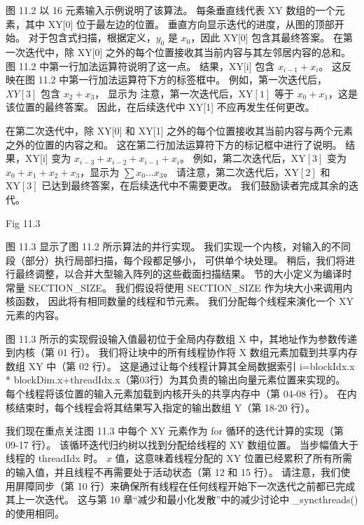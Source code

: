 图 11.2 以 16 元素输入示例说明了该算法。 每条垂直线代表 XY 数组的一个元素，其中 XY[0] 位于最左边的位置。 
垂直方向显示迭代的进度，从图的顶部开始。 对于包含式扫描，根据定义，$y_{0}$ 是 $x_{0}$，因此 XY[0] 包含其最终答案。 
在第一次迭代中，除 XY[0] 之外的每个位置接收其当前内容与其左邻居内容的总和。 图 11.2 中第一行加法运算符说明了这一点。 
结果，XY[i] 包含 $x_{i-1}+x_{i}$。 这反映在图 11.2 中第一行加法运算符下方的标签框中。 
例如，第一次迭代后，$X Y[3]$ 包含 $x_{2}+x_{3}$，
显示为 注意，第一次迭代后，$\mathrm{XY}[1]$ 等于 $ x_{0}+x_{1}$，这是该位置的最终答案。 
因此，在后续迭代中 XY[1] 不应再发生任何更改。

在第二次迭代中，除 XY[0] 和 XY[1] 之外的每个位置接收其当前内容与两个元素之外的位置的内容之和。 
这在第二行加法运算符下方的标记框中进行了说明。 结果，XY[i] 变为 $x_{i-3}+x_{i-2}+x_{i-1}+x_{i}$。 
例如，第二次迭代后，$\mathrm{XY}[3]$ 变为 $x_{0}+x_{1}+x_{2}+x_{3}$，显示为 $\sum x_{0} \ldots x_{3}$。 
请注意，第二次迭代后，$\mathrm{XY}[2]$ 和 $\mathrm{XY}[3]$ 已达到最终答案，在后续迭代中不需要更改。 
我们鼓励读者完成其余的迭代。

{\color{red} Fig 11.3}

图 11.3 显示了图 11.2 所示算法的并行实现。 我们实现一个内核，对输入的不同段（部分）执行局部扫描，每个段都足够小，
可供单个块处理。 稍后，我们将进行最终调整，以合并大型输入阵列的这些截面扫描结果。 
节的大小定义为编译时常量 SECTION\_SIZE。 我们假设将使用 SECTION\_SIZE 作为块大小来调用内核函数，
因此将有相同数量的线程和节元素。 我们分配每个线程来演化一个 $\mathrm{XY}$ 元素的内容。

图 11.3 所示的实现假设输入值最初位于全局内存数组 $\mathrm{X}$ 中，其地址作为参数传递到内核（第 01 行）。 
我们将让块中的所有线程协作将 $\mathrm{X}$ 数组元素加载到共享内存数组 XY 中（第 02 行）。 
这是通过让每个线程计算其全局数据索引 i=blockIdx.x * blockDim.x+threadIdx.x（第03行）为其负责的输出向量元素位置来实现的。 
每个线程将该位置的输入元素加载到内核开头的共享内存中（第 04-08 行）。
在内核结束时，每个线程会将其结果写入指定的输出数组 Y（第 18-20 行）。

我们现在重点关注图 11.3 中每个 $\mathrm{XY}$ 元素作为 for 循环的迭代计算的实现（第 09-17 行）。 
该循环迭代归约树以找到分配给线程的 $\mathrm{XY}$ 数组位置。 当步幅值大于线程的 threadIdx 时。 
$x$ 值，这意味着线程分配的 XY 位置已经累积了所有所需的输入值，并且线程不再需要处于活动状态（第 12 和 15 行）。 
请注意，我们使用屏障同步（第 10 行）来确保所有线程在任何线程开始下一次迭代之前都已完成其上一次迭代。 
这与第 10 章“减少和最小化发散”中的减少讨论中 \_syncthreads() 的使用相同。

